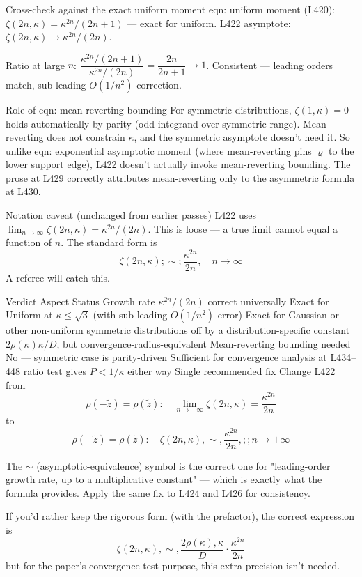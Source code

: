 \documentclass[twoside]{article}
\numberwithin{equation}{section}
\begin{document}
Cross-check against the exact uniform moment
eqn: uniform moment (L420): $\zeta(2n,\kappa) = \kappa^{2n}/(2n+1)$ — exact for uniform.
L422 asymptote: $\zeta(2n,\kappa)\to \kappa^{2n}/(2n)$.

Ratio at large $n$: $\dfrac{\kappa^{2n}/(2n+1)}{\kappa^{2n}/(2n)} = \dfrac{2n}{2n+1} \to 1$.  Consistent — leading orders match, sub-leading $O(1/n^2)$ correction.

Role of eqn: mean-reverting bounding
For symmetric distributions, $\zeta(1,\kappa)=0$ holds automatically by parity (odd integrand over symmetric range). Mean-reverting does not constrain $\kappa$, and the symmetric asymptote doesn't need it. So unlike eqn: exponential asymptotic moment (where mean-reverting pins $\varrho$ to the lower support edge), L422 doesn't actually invoke mean-reverting bounding. The prose at L429 correctly attributes mean-reverting only to the asymmetric formula at L430.

Notation caveat (unchanged from earlier passes)
L422 uses $\lim_{n\to\infty}\zeta(2n,\kappa) = \kappa^{2n}/(2n)$. This is loose — a true limit cannot equal a function of $n$. The standard form is
$$\zeta(2n,\kappa) ;\sim; \frac{\kappa^{2n}}{2n}, \quad n\to\infty$$
A referee will catch this.

Verdict
Aspect	Status
Growth rate $\kappa^{2n}/(2n)$ correct universally
Exact for Uniform at $\kappa\le\sqrt 3$	 (with sub-leading $O(1/n^2)$ error)
Exact for Gaussian or other non-uniform symmetric distributions	 off by a distribution-specific constant $2\rho(\kappa)\kappa/D$, but convergence-radius-equivalent
Mean-reverting bounding needed	No — symmetric case is parity-driven
Sufficient for convergence analysis at L434–448	 ratio test gives $P<1/\kappa$ either way
Single recommended fix
Change L422 from
$$\rho(-\tilde z)=\rho(\tilde z):\quad \lim_{n\to+\infty}\zeta(2n,\kappa) = \frac{\kappa^{2n}}{2n}$$
to
$$\rho(-\tilde z)=\rho(\tilde z):\quad \zeta(2n,\kappa) ,\sim, \frac{\kappa^{2n}}{2n}, ;; n\to+\infty$$

The $\sim$ (asymptotic-equivalence) symbol is the correct one for "leading-order growth rate, up to a multiplicative constant" — which is exactly what the formula provides. Apply the same fix to L424 and L426 for consistency.

If you'd rather keep the rigorous form (with the prefactor), the correct expression is
$$\zeta(2n,\kappa) ,\sim, \frac{2\rho(\kappa),\kappa}{D}\cdot\frac{\kappa^{2n}}{2n}$$
but for the paper's convergence-test purpose, this extra precision isn't needed.
\end{document}
